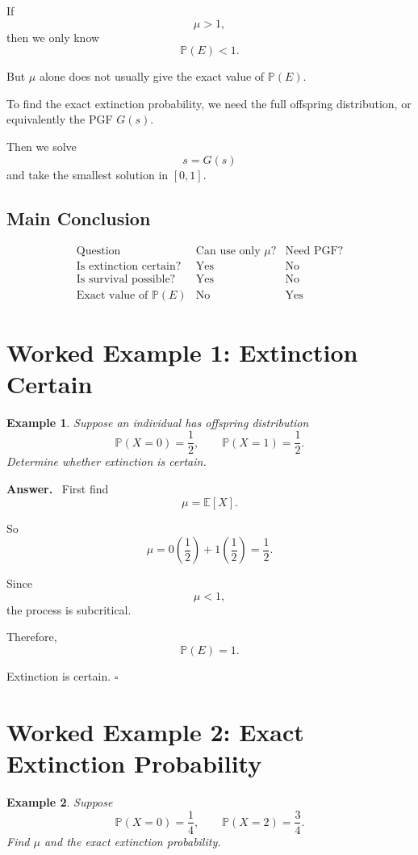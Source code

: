 \documentclass[12pt,a4paper]{article}
\theoremstyle{notestyle}
\newtheorem{example}{Example}
\newenvironment{answer}
{\par\textbf{Answer.}\ }
{\hfill$\square$\par}
\newcommand{\Prob}{\mathbb{P}}
\newcommand{\E}{\mathbb{E}}
\begin{document}
If
\[
\mu>1,
\]
then we only know
\[
\Prob(E)<1.
\]

But $\mu$ alone does not usually give the exact value of $\Prob(E)$.

To find the exact extinction probability, we need the full offspring distribution, or equivalently the PGF $G(s)$.

Then we solve
\[
s=G(s)
\]
and take the smallest solution in $[0,1]$.

\subsection*{Main Conclusion}

\[
\begin{array}{c|c|c}
\text{Question} & \text{Can use only }\mu? & \text{Need PGF?}\\
\hline
\text{Is extinction certain?} & \text{Yes} & \text{No}\\
\text{Is survival possible?} & \text{Yes} & \text{No}\\
\text{Exact value of }\Prob(E) & \text{No} & \text{Yes}
\end{array}
\]

\section{Worked Example 1: Extinction Certain}

\begin{example}
Suppose an individual has offspring distribution
\[
\Prob(X=0)=\frac12,\qquad \Prob(X=1)=\frac12.
\]
Determine whether extinction is certain.
\end{example}

\begin{answer}
First find
\[
\mu=\E[X].
\]

So
\[
\mu=0\left(\frac12\right)+1\left(\frac12\right)=\frac12.
\]

Since
\[
\mu<1,
\]
the process is subcritical.

Therefore,
\[
\boxed{\Prob(E)=1.}
\]

Extinction is certain.
\end{answer}

\section{Worked Example 2: Exact Extinction Probability}

\begin{example}
Suppose
\[
\Prob(X=0)=\frac14,\qquad \Prob(X=2)=\frac34.
\]
Find $\mu$ and the exact extinction probability.
\end{example}
\end{document}
